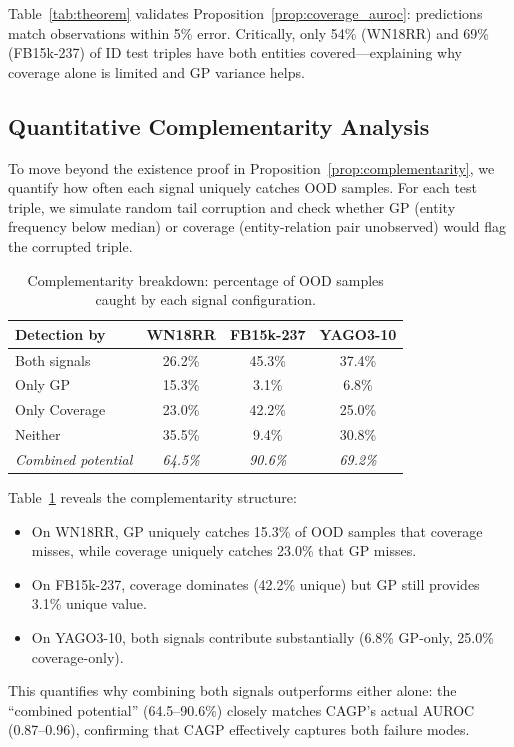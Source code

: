 Table~\ref{tab:theorem} validates Proposition~\ref{prop:coverage_auroc}: predictions match observations within 5\% error.
Critically, only 54\% (WN18RR) and 69\% (FB15k-237) of ID test triples have both entities covered---explaining why coverage alone is limited and GP variance helps.

\subsection{Quantitative Complementarity Analysis}

To move beyond the existence proof in Proposition~\ref{prop:complementarity}, we quantify how often each signal uniquely catches OOD samples.
For each test triple, we simulate random tail corruption and check whether GP (entity frequency below median) or coverage (entity-relation pair unobserved) would flag the corrupted triple.

\begin{table}[t]
\centering
\caption{Complementarity breakdown: percentage of OOD samples caught by each signal configuration.}
\label{tab:complementarity}
\vspace{0.5em}
\begin{tabular}{lccc}
\toprule
Detection by & WN18RR & FB15k-237 & YAGO3-10 \\
\midrule
Both signals & 26.2\% & 45.3\% & 37.4\% \\
Only GP & 15.3\% & 3.1\% & 6.8\% \\
Only Coverage & 23.0\% & 42.2\% & 25.0\% \\
Neither & 35.5\% & 9.4\% & 30.8\% \\
\midrule
\emph{Combined potential} & \emph{64.5\%} & \emph{90.6\%} & \emph{69.2\%} \\
\bottomrule
\end{tabular}
\end{table}

Table~\ref{tab:complementarity} reveals the complementarity structure:
\begin{itemize}
    \item On WN18RR, GP uniquely catches 15.3\% of OOD samples that coverage misses, while coverage uniquely catches 23.0\% that GP misses.
    \item On FB15k-237, coverage dominates (42.2\% unique) but GP still provides 3.1\% unique value.
    \item On YAGO3-10, both signals contribute substantially (6.8\% GP-only, 25.0\% coverage-only).
\end{itemize}
This quantifies why combining both signals outperforms either alone: the ``combined potential'' (64.5--90.6\%) closely matches CAGP's actual AUROC (0.87--0.96), confirming that CAGP effectively captures both failure modes.

